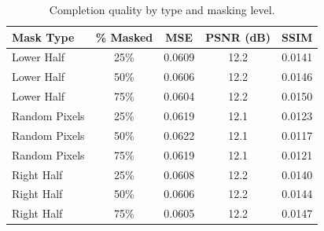 \begin{table}[htbp]
\centering
\caption{Completion quality by type and masking level.}
\label{tab:completion}
\begin{tabular}{lcccc}
\hline
\textbf{Mask Type} & \textbf{\% Masked} & \textbf{MSE} & \textbf{PSNR (dB)} & \textbf{SSIM} \\
\hline
Lower Half & 25\% & 0.0609 & 12.2 & 0.0141 \\
Lower Half & 50\% & 0.0606 & 12.2 & 0.0146 \\
Lower Half & 75\% & 0.0604 & 12.2 & 0.0150 \\
\hline
Random Pixels & 25\% & 0.0619 & 12.1 & 0.0123 \\
Random Pixels & 50\% & 0.0622 & 12.1 & 0.0117 \\
Random Pixels & 75\% & 0.0619 & 12.1 & 0.0121 \\
\hline
Right Half & 25\% & 0.0608 & 12.2 & 0.0140 \\
Right Half & 50\% & 0.0606 & 12.2 & 0.0144 \\
Right Half & 75\% & 0.0605 & 12.2 & 0.0147 \\
\hline
\end{tabular}
\end{table}

